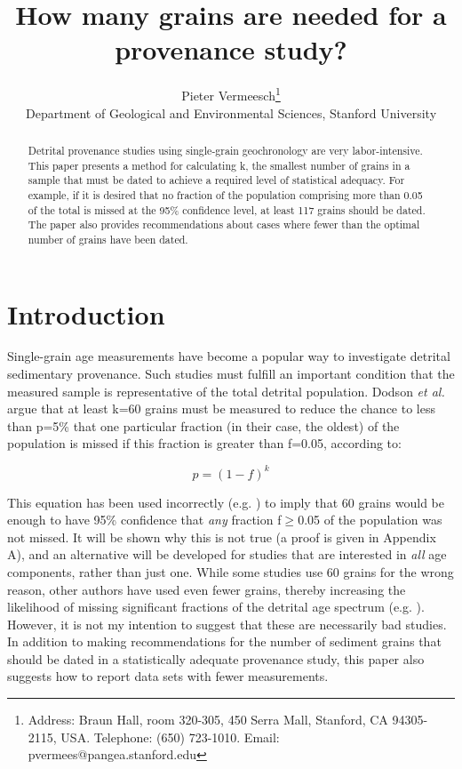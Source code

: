 \documentclass[12]{article}
\title{How many grains are needed for a provenance study?}
\author{Pieter Vermeesch\footnote{Address: 
    Braun Hall, room 320-305, 450 Serra Mall, Stanford, CA 94305-2115, USA. \newline
    Telephone: (650) 723-1010. Email: pvermees@pangea.stanford.edu \newline
}
    \\
    {\normalsize Department of Geological and Environmental Sciences, Stanford University}
}
\date{}
\begin{document}
\maketitle \doublespacing
\begin{abstract}
Detrital provenance studies  using single-grain geochronology are very
labor-intensive. This  paper presents a method for  calculating k, the
smallest number of grains in a  sample that must be dated to achieve a
required level of statistical adequacy.  For example, if it is desired
that no  fraction of the population  comprising more than  0.05 of the
total  is missed at  the 95\%  confidence level,  at least  117 grains
should be dated.  The  paper also provides recommendations about cases
where fewer than the optimal number of grains have been dated.
\end{abstract}

\section{Introduction}\label{sec:intro}

Single-grain age measurements have become a popular way to investigate
detrital  sedimentary  provenance.    Such  studies  must  fulfill  an
important condition that the  measured sample is representative of the
total  detrital population.   Dodson {\it  et  al.}  \cite{dodson1988}
argue that at least k=60 grains  must be measured to reduce the chance
to less  than p=5\% that one  particular fraction (in  their case, the
oldest) of the  population is missed if this  fraction is greater than
f=0.05, according to:

\begin{equation}
  \label{eq:1}
  p = (1-f)^k
\end{equation}

This     equation     has      been     used     incorrectly     (e.g.
\cite{morton1996,cawood2001}) to imply that  60 grains would be enough
to have  95\% confidence  that {\it any}  fraction f$\geq$0.05  of the
population was not  missed.  It will be shown why this  is not true (a
proof is  given in Appendix A),  and an alternative  will be developed
for studies  that are interested  in {\it all} age  components, rather
than just one.  While some studies use 60 grains for the wrong reason,
other  authors have  used even  fewer grains,  thereby  increasing the
likelihood  of  missing  significant  fractions of  the  detrital  age
spectrum (e.g.   \cite{rahl2003,grimmer2003}).  However, it  is not my
intention  to suggest  that  these are  necessarily  bad studies.   In
addition to  making recommendations for the number  of sediment grains
that  should be dated  in a  statistically adequate  provenance study,
this  paper  also  suggests  how   to  report  data  sets  with  fewer
measurements.
\end{document}
